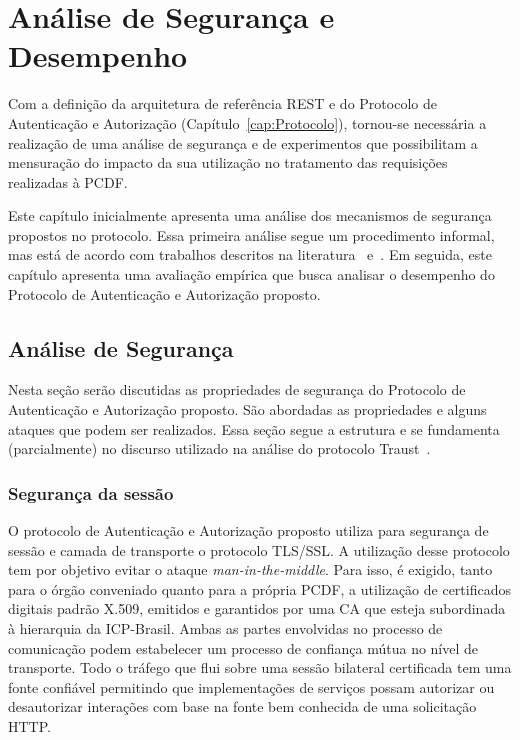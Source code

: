 \chapter{Análise de Segurança e Desempenho}

Com a definição da arquitetura de referência REST e do Protocolo de Autenticação e Autorização (Capítulo~\ref{cap:Protocolo}), tornou-se necessária a realização de uma análise de segurança e de experimentos que possibilitam a mensuração do impacto da sua utilização no tratamento das requisições realizadas à PCDF.

Este capítulo inicialmente apresenta uma análise dos mecanismos de segurança propostos no protocolo. Essa primeira análise segue um procedimento informal, mas está de acordo com trabalhos descritos na literatura~\cite{traust08} e~\cite{Altair2004}. Em seguida, este capítulo apresenta uma avaliação empírica que busca analisar o desempenho do Protocolo de Autenticação e Autorização proposto.

\section{Análise de Segurança}

Nesta seção serão discutidas as propriedades de segurança do Protocolo de Autenticação e Autorização proposto. São abordadas as propriedades e alguns ataques que podem ser realizados. Essa seção segue a estrutura e se fundamenta (parcialmente) no discurso utilizado na análise do protocolo Traust~\cite{traust08}.

\subsection{Segurança da sessão}

O protocolo de Autenticação e Autorização proposto utiliza para segurança de sessão e camada de transporte o protocolo TLS/SSL. A utilização desse protocolo tem por objetivo evitar o ataque \emph{man-in-the-middle}. Para isso, é exigido, tanto para o órgão conveniado quanto para a própria PCDF, a utilização de certificados digitais padrão X.509, emitidos e garantidos por uma CA que esteja subordinada à hierarquia da ICP-Brasil. Ambas as partes envolvidas no processo de comunicação podem estabelecer um processo de confiança mútua no nível de transporte. Todo o tráfego que flui sobre uma sessão bilateral certificada tem uma fonte confiável permitindo que implementações de serviços possam autorizar ou desautorizar interações com base na fonte bem conhecida de uma solicitação HTTP.

